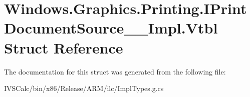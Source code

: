 \hypertarget{struct_windows_1_1_graphics_1_1_printing_1_1_i_print_document_source_____impl_1_1_vtbl}{}\section{Windows.\+Graphics.\+Printing.\+I\+Print\+Document\+Source\+\_\+\+\_\+\+Impl.\+Vtbl Struct Reference}
\label{struct_windows_1_1_graphics_1_1_printing_1_1_i_print_document_source_____impl_1_1_vtbl}


The documentation for this struct was generated from the following file\+:\begin{DoxyCompactItemize}
\item 
I\+V\+S\+Calc/bin/x86/\+Release/\+A\+R\+M/ilc/Impl\+Types.\+g.\+cs\end{DoxyCompactItemize}
